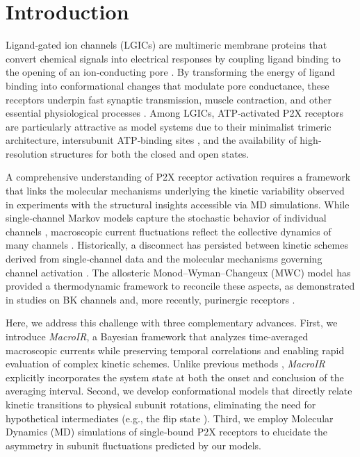 \documentclass[pdflatex,sn-nature]{sn-jnl}%
\begin{document}

\maketitle
\section{Introduction}
Ligand‐gated ion channels (LGICs) are multimeric membrane proteins that convert chemical signals into electrical responses by coupling ligand binding to the opening of an ion‐conducting pore \cite{Changeux1984AcetylcholineRA,UNWIN199331,Lemoine2012,galligan2002ligand,feske2012ion}. By transforming the energy of ligand binding into conformational changes that modulate pore conductance, these receptors underpin fast synaptic transmission, muscle contraction, and other essential physiological processes \cite{nakanishi1994metabotropic,greengard2001neurobiology,burnstock2007physiology}. Among LGICs, ATP‐activated P2X receptors are particularly attractive as model systems due to their minimalist trimeric architecture, intersubunit ATP‐binding sites \cite{MarquezKlaka2007IdentificationOA}, and the availability of high‐resolution structures for both the closed \cite{cerrada_p2x} and open \cite{abierta_p2x} states.

A comprehensive understanding of P2X receptor activation requires a framework that links the molecular mechanisms underlying the kinetic variability observed in experiments with the structural insights accessible via MD simulations. While single‐channel Markov models capture the stochastic behavior of individual channels \cite{properties_single_channe}, macroscopic current fluctuations reflect the collective dynamics of many channels \cite{Moffatt_hume}. Historically, a disconnect has persisted between kinetic schemes derived from single‐channel data and the molecular mechanisms governing channel activation \cite{abierta_p2x}. The allosteric Monod–Wyman–Changeux (MWC) model \cite{Changeux1984AcetylcholineRA} has provided a thermodynamic framework to reconcile these aspects, as demonstrated in studies on BK channels \cite{Horrigan2002CouplingBV} and, more recently, purinergic receptors \cite{Moffatt_hume,Sattler2020UnravellingTI}.

Here, we address this challenge with three complementary advances. First, we introduce \textit{MacroIR}, a Bayesian framework that analyzes time‐averaged macroscopic currents while preserving temporal correlations and enabling rapid evaluation of complex kinetic schemes. Unlike previous methods \cite{Munch2022}, \textit{MacroIR} explicitly incorporates the system state at both the onset and conclusion of the averaging interval. Second, we develop conformational models that directly relate kinetic transitions to physical subunit rotations, eliminating the need for hypothetical intermediates (e.g., the flip state \cite{Moffatt_hume,jiang2012intermediate,browne2013p2x}). Third, we employ Molecular Dynamics (MD) simulations of single‐bound P2X receptors to elucidate the asymmetry in subunit fluctuations predicted by our models.
\end{document}
